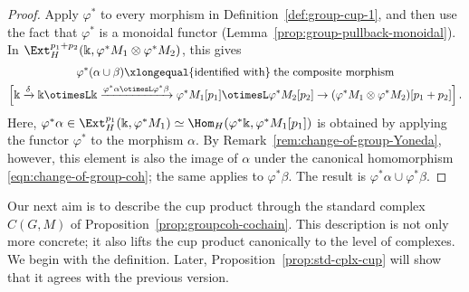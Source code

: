 \begin{proof}
	Apply $\varphi^*$ to every morphism in
	Definition~\ref{def:group-cup-1}, and then use the fact that $\varphi^*$ is
	a monoidal functor (Lemma~\ref{prop:group-pullback-monoidal}). In
	$\Ext_H^{p_1+p_2}(\Bbbk,\varphi^*M_1\otimes\varphi^*M_2)$, this gives
	\begin{multline*}
		\varphi^*(\alpha \cup \beta) \xlongequal{\text{identified with}} \;\text{the composite morphism} \\
		\left[ \Bbbk \xrightarrow{\delta} \Bbbk \otimesL \Bbbk \xrightarrow{\varphi^* \alpha \otimesL \varphi^* \beta} \varphi^* M_1[p_1] \otimesL \varphi^* M_2[p_2] \to (\varphi^* M_1 \otimes \varphi^* M_2)[p_1 + p_2] \right].
	\end{multline*}
	Here,
	$\varphi^*\alpha\in\Ext_H^{p_1}(\Bbbk,\varphi^*M_1)
	\simeq\Hom_H(\varphi^*\Bbbk,\varphi^*M_1[p_1])$ is obtained by applying
	the functor $\varphi^*$ to the morphism $\alpha$. By
	Remark~\ref{rem:change-of-group-Yoneda}, however, this element is also the
	image of $\alpha$ under the canonical homomorphism
	\eqref{eqn:change-of-group-coh}; the same applies to $\varphi^*\beta$.
	The result is $\varphi^*\alpha\cup\varphi^*\beta$.
\end{proof}

Our next aim is to describe the cup product through the standard complex
$C(G,M)$ of Proposition~\ref{prop:groupcoh-cochain}. This description is not
only more concrete; it also lifts the cup product canonically to the level of
complexes. We begin with the definition. Later,
Proposition~\ref{prop:std-cplx-cup} will show that it agrees with the previous
version.

